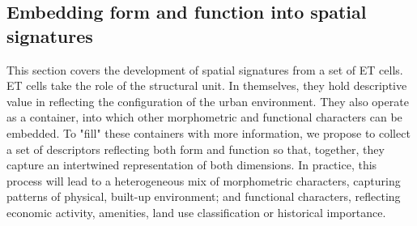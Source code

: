 \subsection{Embedding form and function into spatial signatures}
\label{ssec:ss_ff}

%
This section covers the development of spatial signatures from a set of ET cells.
ET cells take the role of the structural unit.
In themselves, they hold descriptive value in reflecting the configuration of
the urban environment. They also operate as a container, into which other
morphometric and functional characters can be embedded.
To "fill" these containers with more information,
we propose to collect a set of descriptors reflecting both form
and function so that, together, they capture an intertwined representation
of both dimensions.
%
In practice, this process will lead to a heterogeneous
mix of morphometric characters, capturing patterns of physical, built-up
environment; and functional characters, reflecting economic activity, amenities,
land use classification or historical importance.

